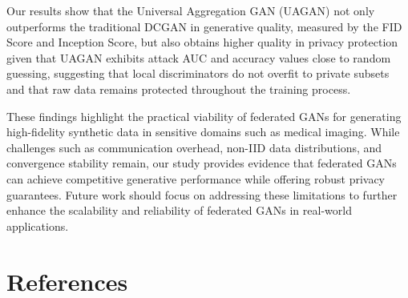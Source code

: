 \documentclass{article}
\begin{document}
Our results show that the Universal Aggregation GAN (UAGAN) not only outperforms the traditional DCGAN in generative quality, measured by the FID Score and Inception Score, but also obtains higher quality in privacy protection given that UAGAN exhibits attack AUC and accuracy values close to random guessing, suggesting that local discriminators do not overfit to private subsets and that raw data remains protected throughout the training process.

These findings highlight the practical viability of federated GANs for generating high-fidelity synthetic data in sensitive domains such as medical imaging. While challenges such as communication overhead, non-IID data distributions, and convergence stability remain, our study provides evidence that federated GANs can achieve competitive generative performance while offering robust privacy guarantees. Future work should focus on addressing these limitations to further enhance the scalability and reliability of federated GANs in real-world applications.



\section*{References}
\end{document}

